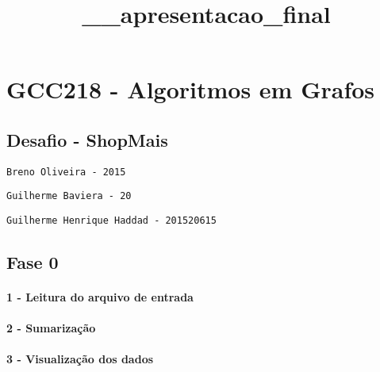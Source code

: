 \documentclass[11pt]{article}
\title{\_\_apresentacao\_final}
\begin{document}
    
    
    \maketitle
    
    

    
    \section{GCC218 - Algoritmos em
Grafos}\label{gcc218---algoritmos-em-grafos}

\subsection{Desafio - ShopMais}\label{desafio---shopmais}

\texttt{Breno\ Oliveira\ -\ 2015}

\texttt{Guilherme\ Baviera\ -\ 20}

\texttt{Guilherme\ Henrique\ Haddad\ -\ 201520615}

\subsection{Fase 0}\label{fase-0}

\paragraph{1 - Leitura do arquivo de
entrada}\label{leitura-do-arquivo-de-entrada}

\paragraph{2 - Sumarização}\label{sumarizauxe7uxe3o}

\paragraph{3 - Visualização dos
dados}\label{visualizauxe7uxe3o-dos-dados}
\end{document}
